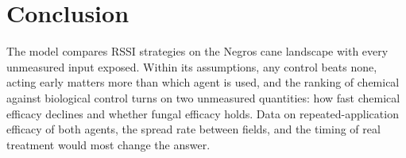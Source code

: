 \documentclass[conference]{IEEEtran}
\begin{document}
\section{Conclusion}

The model compares RSSI strategies on the Negros cane landscape with every unmeasured input exposed. Within its assumptions, any control beats none, acting early matters more than which agent is used, and the ranking of chemical against biological control turns on two unmeasured quantities: how fast chemical efficacy declines and whether fungal efficacy holds. Data on repeated-application efficacy of both agents, the spread rate between fields, and the timing of real treatment would most change the answer.



\end{document}

